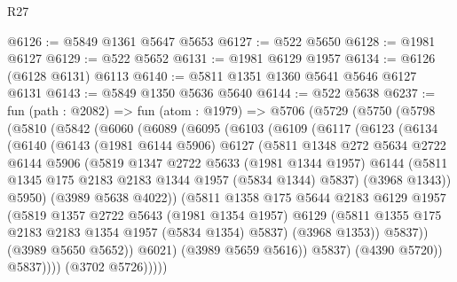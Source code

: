 \begin{lexlean}{R27}
\begin{coremodule}
@6126 := @5849 @1361 @5647 @5653
@6127 := @522 @5650
@6128 := @1981 @6127
@6129 := @522 @5652
@6131 := @1981 @6129 @1957
@6134 := @6126 (@6128 @6131) @6113
@6140 := @5811 @1351 @1360 @5641 @5646 @6127 @6131
@6143 := @5849 @1350 @5636 @5640
@6144 := @522 @5638
@6237 := fun (path : @2082) =>
  fun (atom : @1979) =>
  @5706
    (@5729
      (@5750
        (@5798
          (@5810
            (@5842
              (@6060
                (@6089
                  (@6095
                    (@6103
                      (@6109
                        (@6117
                          (@6123
                            (@6134
                              (@6140
                                (@6143
                                  (@1981 @6144 @5906)
                                  @6127
                                  (@5811
                                    @1348
                                    @272
                                    @5634
                                    @2722
                                    @6144
                                    @5906
                                    (@5819
                                      @1347
                                      @2722
                                      @5633
                                      (@1981 @1344 @1957)
                                      @6144
                                      (@5811 @1345 @175 @2183 @2183 @1344 @1957 (@5834 @1344) @5837)
                                      (@3968 @1343))
                                    @5950)
                                  (@3989 @5638 @4022))
                                (@5811
                                  @1358
                                  @175
                                  @5644
                                  @2183
                                  @6129
                                  @1957
                                  (@5819
                                    @1357
                                    @2722
                                    @5643
                                    (@1981 @1354 @1957)
                                    @6129
                                    (@5811 @1355 @175 @2183 @2183 @1354 @1957 (@5834 @1354) @5837)
                                    (@3968 @1353))
                                  @5837))
                              (@3989 @5650 @5652))
                            @6021)
                          (@3989 @5659 @5616))
                        @5837)
                      (@4390 @5720))
                    @5837))))
            (@3702 @5726)))))

\end{coremodule}
\end{lexlean}
